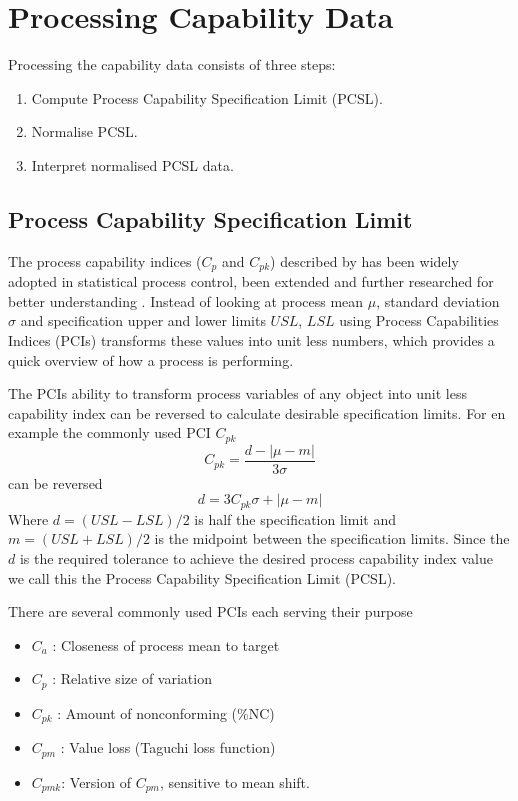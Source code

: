 \documentclass[aip,amsmath, reprint, author-year]{revtex4-1}
\begin{document}
\section{Processing Capability Data}

Processing the capability data consists of three steps: 

\begin{enumerate}
	\item Compute Process Capability Specification Limit (PCSL).
	\item Normalise PCSL.
	\item Interpret normalised PCSL data.
\end{enumerate}

\subsection{Process Capability Specification Limit}
The process capability indices ($C_p$ and $C_{pk}$) described by \cite{kane1986process} has been widely adopted in statistical process control, been extended and further researched for better understanding \citep{wu2009overview}. 
Instead of looking at process mean $\mu$, standard deviation $\sigma$ and specification upper and lower limits $USL$, $LSL$ using Process Capabilities Indices (PCIs) transforms these values into unit less numbers, which provides a quick overview of how a process is performing.

The PCIs ability to transform process variables of any object into unit less capability index can be reversed to calculate desirable specification limits. For en example the commonly used PCI $C_{pk}$ 
\begin{equation}
	C_{pk} = \frac{d - | \mu - m|}{3 \sigma}
\end{equation}
can be reversed
\begin{equation}
	d = 3 C_{pk} \sigma + | \mu - m|
\end{equation}
Where $d = (USL - LSL) / 2$ is half the specification limit and $m = (USL + LSL) / 2$ is the midpoint between the specification limits. Since the $d$ is the required tolerance to achieve the desired process capability index value we call this the Process Capability Specification Limit (PCSL). 

There are several commonly used PCIs each serving their purpose \citep{wu2009overview, taguchi1986introduction}
\begin{itemize}
	\item $C_a$ : Closeness of process mean to target 
	\item $C_p$ : Relative size of variation
	\item $C_{pk}$ : Amount of nonconforming (\%NC)
	\item $C_{pm}$ : Value loss (Taguchi loss function)
	\item $C_{pmk}$: Version of $C_{pm}$,  sensitive to mean shift. 
\end{itemize}
\end{document}
